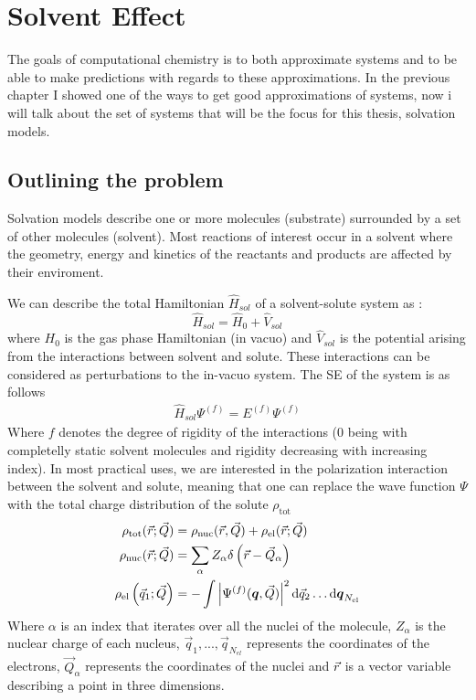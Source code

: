 \documentclass[../master_thesis.tex]{subfiles}
\begin{document}
\chapter{Solvent Effect}\label{Solvent_effect}
The goals of computational chemistry is to both approximate systems and to be
able to make predictions with regards to these approximations. In the previous
chapter I showed one of the ways to get good approximations of systems, now i
will talk about the set of systems that will be the focus for this thesis,
solvation models.
\section{Outlining the problem}
Solvation models describe one or more molecules (substrate) surrounded by
a set of other molecules (solvent). Most reactions of interest occur in a
solvent where the geometry, energy and kinetics of the reactants and products
are affected by their enviroment\cite{Mennucci:2018}.

We can describe the total Hamiltonian $\hat{H}_{sol}$ of a solvent-solute system as
\cite{Tomasi:1994wt}:
\begin{equation}\label{eq:Hsolvent}
  \hat{H}_{sol} = \hat{H}_0 + \hat{V}_{sol}
\end{equation}
where $H_0$ is the gas phase Hamiltonian (in vacuo) and $\hat{V}_{sol}$ is the
potential arising from the interactions between solvent and solute. These
interactions can be considered as perturbations to the in-vacuo system.
The \ac{SE} of the system is as follows \cite{Tomasi:1994wt}
\begin{align}\label{eq:solSE}
  \hat{H}_{sol}\Psi^{(f)} = E^{(f)}\Psi^{(f)}
\end{align}
Where $f$ denotes the degree of  rigidity of the interactions (0 being with
completelly static solvent molecules and rigidity decreasing with increasing
index). In most practical uses, we are interested in the polarization interaction
between the solvent and solute, meaning that one can replace the wave function $\Psi$ with the
total charge distribution of the solute $\rho_{\mathrm{tot}}$
\cite{Tomasi:1994wt}
\begin{align}
  \begin{split}\mathbb{}
      \rho_{\mathrm{tot}}(\vec{r} ; \vec{Q}) &=
      \rho_{\mathrm{nuc}}(\vec{r}, \vec{Q})
      + \rho_{\mathrm{el}}(\vec{r} ; \vec{Q}) \\
      \rho_{\mathrm{nuc}}(\vec{r} ; \vec{Q}) &=
      \sum_{\alpha} Z_{\alpha} \delta\left(\vec{r}
      - \vec{Q}_{\alpha}\right) \\
      \rho_{\mathrm{el}}\left(\vec{q}_{1} ; \vec{Q}\right) &=
      -\int\left|\Psi^{(f)}(\boldsymbol{q}, \vec{Q})\right|^{2}
      \mathrm{d}\vec{q}_{2} \ldots \mathrm{d}\boldsymbol{q}_{N_{\mathrm{el}}}
  \end{split}
\end{align}
Where $\alpha$ is an index that iterates over all the nuclei of the molecule,
$Z_{\alpha}$ is the nuclear charge of each nucleus, $\vec{q}_1, ..., \vec{q}_{N_{el}}$
represents the coordinates of the electrons, $\vec{Q}_{\alpha}$ represents the
coordinates of the nuclei and $\vec{r}$ is a vector variable describing a point
in three dimensions.
\end{document}

